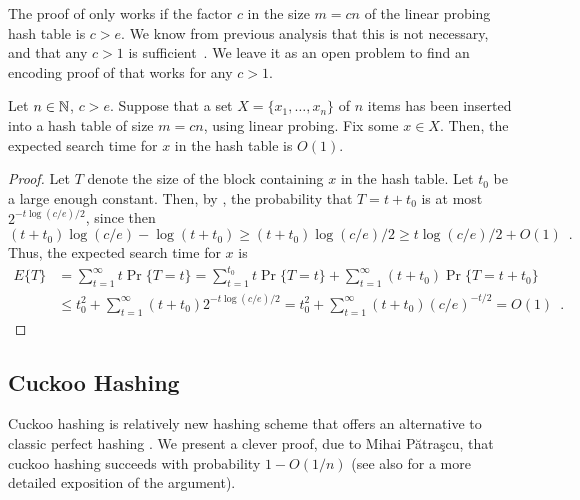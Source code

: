 \documentclass[prodmode,acmcsur]{acmsmall}
\begin{document}
\begin{rem}
  The proof of  only works if the factor
  $c$ in the size $m = cn$ of the linear probing hash table is 
  $c > e$.
  We know from
  previous analysis that this is not necessary, and that any $c>1$ is
  sufficient~\cite[Theorem~9.8]{flajolet.sedgewick:aofa}. 
  We leave it as an open problem to find an encoding proof
  of  that works for any $c>1$.
\end{rem}

\begin{cor}
  Let $n \in \mathbb{N}$, $c > e$.
  Suppose that a set $X = \{x_1, \dots, x_n\}$ of $n$ items 
  has been inserted into a hash table of size $m = cn$, using linear 
  probing.
  Fix some $x\in X$. 
  Then, the expected search time for $x$ in the hash table is
  $O(1)$.
\end{cor}
\begin{proof}
  Let $T$ denote the size of the block containing $x$ in the
  hash table. Let $t_0$ be a large enough constant. 
  Then, by , the probability
  that $T = t + t_0$ is at most $2^{-t\log(c/e)/2}$,
  since then
  \[(t  + t_0)\log(c/e) - \log(t+t_0)
  \geq
(t  + t_0)\log(c/e)/2
    \geq t\log(c/e)/2 + O(1) \enspace. 
    \]
  Thus, the expected search time for $x$ is
  \begin{align*}
   E\{T\} &= \sum_{t = 1}^\infty t\Pr\{T = t\} = \sum_{t=1}^{t_0} t\Pr\{T = t\} + \sum_{t = 1}^\infty (t+t_0)\Pr\{T = t + t_0\} \\
            &\le t_0^2 + \sum_{t = 1}^\infty (t+t_0)2^{-t \log (c/e)/2} = t_0^2 + \sum_{t = 1}^\infty (t+t_0)(c/e)^{-t/2} = O(1) \enspace . %
  \end{align*}
\end{proof}

\subsection{Cuckoo Hashing}

Cuckoo hashing is relatively new hashing scheme that offers an
alternative to classic perfect hashing \cite{pagh.rodler:cuckoo}. 
We present a clever proof, due to Mihai Pătraşcu, that cuckoo hashing
succeeds with probability $1-O(1/n)$ \cite{patrascu:cuckoo}
(see also \cite{haimberger:cuckoo} for a more detailed exposition of the 
argument).
\end{document}
